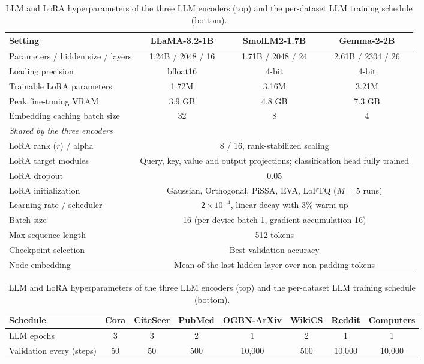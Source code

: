 \documentclass[a4paper,fleqn]{cas-sc}
\begin{document}
\begin{table}[htbp]
\centering\color{red}
\caption{LLM and LoRA hyperparameters of the three LLM encoders (top) and the per-dataset LLM training schedule (bottom).}
\label{tab:hyperparams}
\small
\begin{tabular*}{\textwidth}{@{\extracolsep{\fill}} lccc @{}}
\toprule
\textbf{Setting} & \textbf{LLaMA-3.2-1B} & \textbf{SmolLM2-1.7B} & \textbf{Gemma-2-2B} \\
\midrule
Parameters / hidden size / layers & 1.24B / 2048 / 16 & 1.71B / 2048 / 24 & 2.61B / 2304 / 26 \\
Loading precision & bfloat16 & 4-bit & 4-bit \\
Trainable LoRA parameters & 1.72M & 3.16M & 3.21M \\
Peak fine-tuning VRAM & 3.9 GB & 4.8 GB & 7.3 GB \\
Embedding caching batch size & 32 & 8 & 4 \\
\midrule
\multicolumn{4}{l}{\textit{Shared by the three encoders}} \\
\midrule
LoRA rank ($r$) / alpha & \multicolumn{3}{c}{8 / 16, rank-stabilized scaling \citep{kalajdzievski2023rslora}} \\
LoRA target modules & \multicolumn{3}{c}{Query, key, value and output projections; classification head fully trained} \\
LoRA dropout & \multicolumn{3}{c}{0.05} \\
LoRA initialization & \multicolumn{3}{c}{Gaussian, Orthogonal, PiSSA, EVA, LoFTQ ($M=5$ runs)} \\
Learning rate / scheduler & \multicolumn{3}{c}{$2\times10^{-4}$, linear decay with 3\% warm-up} \\
Batch size & \multicolumn{3}{c}{16 (per-device batch 1, gradient accumulation 16)} \\
Max sequence length & \multicolumn{3}{c}{512 tokens} \\
Checkpoint selection & \multicolumn{3}{c}{Best validation accuracy} \\
Node embedding & \multicolumn{3}{c}{Mean of the last hidden layer over non-padding tokens} \\
\bottomrule
\end{tabular*}

\vspace{0.8em}
\footnotesize
\setlength{\tabcolsep}{3pt}
\begin{tabular*}{\textwidth}{@{\extracolsep{\fill}} lccccccc @{}}
\toprule
\textbf{Schedule} & \textbf{Cora} & \textbf{CiteSeer} & \textbf{PubMed} & \textbf{OGBN-ArXiv} & \textbf{WikiCS} & \textbf{Reddit} & \textbf{Computers} \\
\midrule
LLM epochs & 3 & 3 & 2 & 1 & 2 & 1 & 1 \\
Validation every (steps) & 50 & 50 & 500 & 10,000 & 500 & 10,000 & 10,000 \\
\bottomrule
\end{tabular*}
\end{table}
\end{document}
